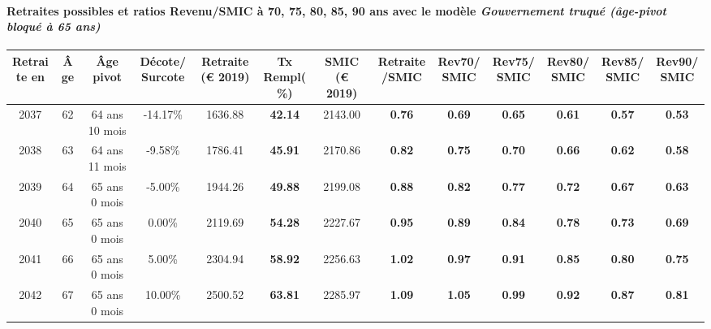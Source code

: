 \paragraph{Retraites possibles et ratios Revenu/SMIC à 70, 75, 80, 85, 90 ans avec le modèle \emph{Gouvernement truqué (âge-pivot bloqué à 65 ans)}}  
 
{ \scriptsize \begin{center} 
\begin{tabular}[htb]{|c|c||c|c||c|c||c||c|c|c|c|c|c|} 
\hline 
 Retraite en &  Âge &  Âge pivot &  Décote/Surcote &  Retraite (\euro{} 2019) &  Tx Rempl(\%) &  SMIC (\euro{} 2019) &  Retraite/SMIC &  Rev70/SMIC &  Rev75/SMIC &  Rev80/SMIC &  Rev85/SMIC &  Rev90/SMIC \\ 
\hline \hline 
 2037 &  62 &  64 ans 10 mois &  -14.17\% &  1636.88 &  {\bf 42.14} &  2143.00 &  {\bf {\color{red} 0.76}} &  {\bf {\color{red} 0.69}} &  {\bf {\color{red} 0.65}} &  {\bf {\color{red} 0.61}} &  {\bf {\color{red} 0.57}} &  {\bf {\color{red} 0.53}} \\ 
\hline 
 2038 &  63 &  64 ans 11 mois &  -9.58\% &  1786.41 &  {\bf 45.91} &  2170.86 &  {\bf {\color{red} 0.82}} &  {\bf {\color{red} 0.75}} &  {\bf {\color{red} 0.70}} &  {\bf {\color{red} 0.66}} &  {\bf {\color{red} 0.62}} &  {\bf {\color{red} 0.58}} \\ 
\hline 
 2039 &  64 &  65 ans 0 mois &  -5.00\% &  1944.26 &  {\bf 49.88} &  2199.08 &  {\bf {\color{red} 0.88}} &  {\bf {\color{red} 0.82}} &  {\bf {\color{red} 0.77}} &  {\bf {\color{red} 0.72}} &  {\bf {\color{red} 0.67}} &  {\bf {\color{red} 0.63}} \\ 
\hline 
 2040 &  65 &  65 ans 0 mois &  0.00\% &  2119.69 &  {\bf 54.28} &  2227.67 &  {\bf {\color{red} 0.95}} &  {\bf {\color{red} 0.89}} &  {\bf {\color{red} 0.84}} &  {\bf {\color{red} 0.78}} &  {\bf {\color{red} 0.73}} &  {\bf {\color{red} 0.69}} \\ 
\hline 
 2041 &  66 &  65 ans 0 mois &  5.00\% &  2304.94 &  {\bf 58.92} &  2256.63 &  {\bf 1.02} &  {\bf {\color{red} 0.97}} &  {\bf {\color{red} 0.91}} &  {\bf {\color{red} 0.85}} &  {\bf {\color{red} 0.80}} &  {\bf {\color{red} 0.75}} \\ 
\hline 
 2042 &  67 &  65 ans 0 mois &  10.00\% &  2500.52 &  {\bf 63.81} &  2285.97 &  {\bf 1.09} &  {\bf 1.05} &  {\bf {\color{red} 0.99}} &  {\bf {\color{red} 0.92}} &  {\bf {\color{red} 0.87}} &  {\bf {\color{red} 0.81}} \\ 
\hline 
\hline 
\end{tabular} 
\end{center} } 
